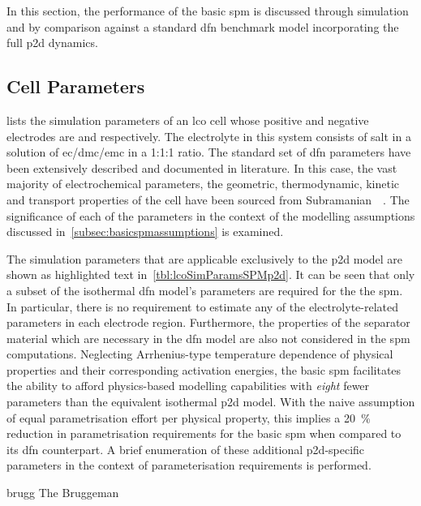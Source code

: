 
In this  section, the performance  of the  basic \gls{spm} is  discussed through
simulation  and  by comparison  against  a  standard \gls{dfn}  benchmark  model
incorporating the full \gls{p2d} dynamics.

\subsection{Cell Parameters}


 lists  the simulation  parameters of  an \gls{lco}
cell  whose positive  and negative  electrodes are   and  
respectively. The electrolyte  in this system consists of   salt in a
solution  of \gls{ec}/\gls{dmc}/\gls{emc}  in a  1:1:1 ratio.  The standard  set
of  \gls{dfn}  parameters have  been  extensively  described and  documented  in
literature.  In this  case,  the vast  majority  of electrochemical  parameters,
\viz{} the  geometric, thermodynamic,  kinetic and  transport properties  of the
cell  have  been  sourced from  Subramanian~\etal{}~\cite{Subramanian2009}.  The
significance  of  each  of  the  parameters in  the  context  of  the  modelling
assumptions discussed in~\cref{subsec:basicspmassumptions} is examined.

The simulation parameters that are applicable exclusively to the \gls{p2d} model
are  shown  as  highlighted  text in~\cref{tbl:lcoSimParamsSPMp2d}.  It  can  be
seen  that only  a subset  of the  isothermal \gls{dfn}  model's parameters  are
required  for  the  the  \gls{spm}.  In  particular,  there  is  no  requirement
to  estimate  any  of  the  electrolyte-related  parameters  in  each  electrode
region.  Furthermore,  the  properties  of  the  separator  material  which  are
necessary  in the  \gls{dfn}  model are  also not  considered  in the  \gls{spm}
computations.  Neglecting  Arrhenius-type  temperature  dependence  of  physical
properties  and their  corresponding  activation energies,  the basic  \gls{spm}
facilitates  the ability  to  afford physics-based  modelling capabilities  with
\emph{eight} fewer  parameters than  the equivalent isothermal  \gls{p2d} model.
With the naive assumption of equal parametrisation effort per physical property,
this implies  a \SI{20}{\percent} reduction in  parametrisation requirements for
the  basic  \gls{spm}  when  compared  to its  \gls{dfn}  counterpart.  A  brief
enumeration of these additional \gls{p2d}-specific  parameters in the context of
parameterisation requirements is performed.
\begin{enumdescriptnum}[leftmargin=!,itemsep=1ex%
    ]
    \item[brugg] The Bruggeman
\end{enumdescriptnum}

